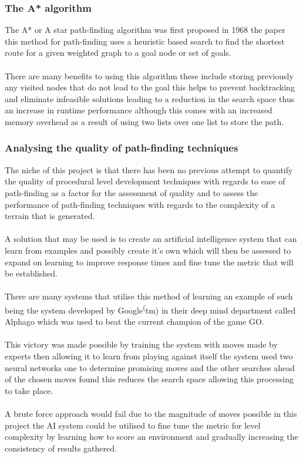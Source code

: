 \subsubsection{The A* algorithm}
The A* or A star path-finding algorithm was first proposed in 1968 the paper \cite{A*} this method for path-finding uses a heuristic based search to find the shortest route for a given weighted graph to a goal node or set of goals.\\\\ There are many benefits to using this algorithm these include storing previously any visited nodes that do not lead to the goal this helps to prevent backtracking and eliminate infeasible solutions leading to a reduction in the search space thus an increase in runtime performance although this comes with an increased memory overhead as a result of using two lists over one list to store the path.   
\subsubsection{Analysing the quality of path-finding techniques}
\label{quality}
The niche of this project is that there has been no previous attempt to quantify the quality of procedural level development techniques with regards to ease of path-finding as a factor for the assessment of quality and  to assess the performance of path-finding techniques with regards to the complexity of a terrain that is generated.\\\\ A solution that may be used is to create an artificial intelligence system that can learn from examples and possibly create it's own which will then be assessed to expand on learning to improve response times and fine tune the metric that will be established.\\\\ There are many systems that utilise this method of learning an example of such being the system developed by Google\textsuperscript(tm) in their deep mind department called Alphago which was used to beat the current champion of the game GO\cite{AI-learning}.\\\\ This victory was made possible by training the system with moves made by experts then allowing it to learn from playing against itself the system used two neural networks one to determine promising moves and the other searches ahead of the chosen moves found this reduces the search space allowing this processing to take place.\\\\ A brute force approach would fail due to the magnitude of moves possible in this project the AI system could be utilised to fine tune the metric for level complexity by learning how to score an environment and gradually increasing the consistency of results gathered.

